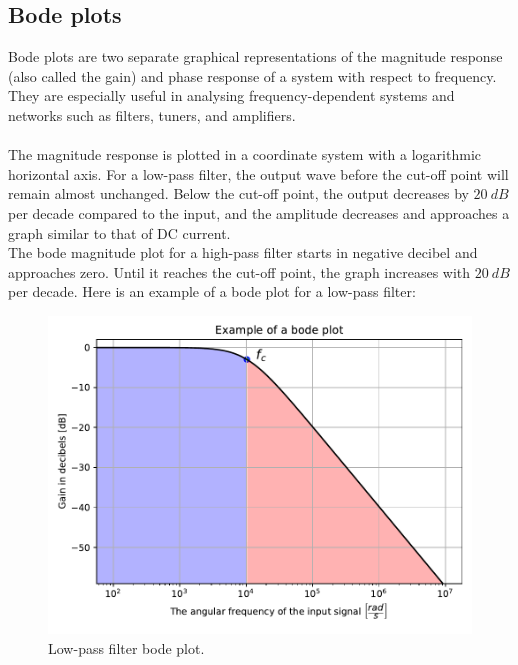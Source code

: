 \subsection{Bode plots} \label{sub:bode}
Bode plots are two separate graphical representations of the magnitude response (also called the gain) and phase response of a system with respect to frequency. They are especially useful in analysing frequency-dependent systems and networks such as filters, tuners, and amplifiers. \cite [p. 626]{bcircuit5}  \\
\\
The magnitude response is plotted in a coordinate system with a logarithmic horizontal axis. For a low-pass filter, the output wave before the cut-off point will remain almost unchanged. Below the cut-off point, the output decreases by $20\ dB$ per decade compared to the input, and the amplitude decreases and approaches a graph similar to that of DC current. \\
The bode magnitude plot for a high-pass filter starts in negative decibel and approaches zero. Until it reaches the cut-off point, the graph increases with $20\ dB$ per decade. Here is an example of a bode plot for a low-pass filter:
\begin{figure}[H]
\center
	\includegraphics[scale=0.5]{fig/img/bode_example.pdf}
	\caption{Low-pass filter bode plot.}
\end{figure}

